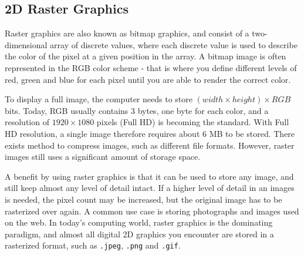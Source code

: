 \subsection{2D Raster Graphics}
Raster graphics are also known as bitmap graphics, and consist of a two-dimensional array of discrete values, where each discrete value is used to describe the color of the pixel at a given position in the array.
A bitmap image is often represented in the RGB color scheme - that is where you define different levels of red, green and blue for each pixel until you are able to render the correct color.

To display a full image, the computer needs to store \( (width \times height) \times RGB \) bits.
Today, RGB usually contains 3 bytes, one byte for each color, and a resolution of \(1920 \times 1080\) pixels (Full HD) is becoming the standard.
With Full HD resolution, a single image therefore requires about 6 MB to be stored.
There exists method to compress images, such as different file formats.
However, raster images still uses a significant amount of storage space.

A benefit by using raster graphics is that it can be used to store any image, and still keep almost any level of detail intact.
If a higher level of detail in an images is needed, the pixel count may be increased, but the original image has to be rasterized over again.
A common use case is storing photographs and images used on the web.
In today's computing world, raster graphics is the dominating paradigm, and almost all digital 2D graphics you encounter are stored in a rasterized format, such as \texttt{.jpeg}, \texttt{.png} and \texttt{.gif}.
